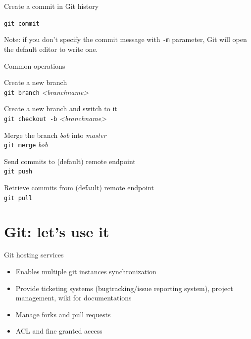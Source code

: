 \begin{frame}[fragile]{Create a commit in Git history}

\vspace{2em}

\Large \texttt{git commit}

\vspace{2em}

Note: if you don't specify the commit message with \texttt{-m} parameter,
Git will open the default editor to write one.

\end{frame}


\begin{frame}[fragile]{Common operations}

Create a new branch \\
\texttt{git branch} \textit{<branchname>}

Create a new branch and switch to it \\
\texttt{git checkout -b} \textit{<branchname>}

Merge the branch \textit{bob} into \textit{master} \\
\texttt{git merge} \textit{bob}

Send commits to (default) remote endpoint \\
\texttt{git push}

Retrieve commits from (default) remote endpoint \\
\texttt{git pull}

\end{frame}




\section{Git: let's use it}

\begin{frame}[fragile]{Git hosting services}
\begin{itemize}
  \item Enables multiple git instances synchronization
  \item Provide ticketing systems (bugtracking/issue reporting system), project
  management, wiki for documentations
  \item Manage forks and pull requests
  \item ACL and fine granted access
\end{itemize}
\end{frame}


